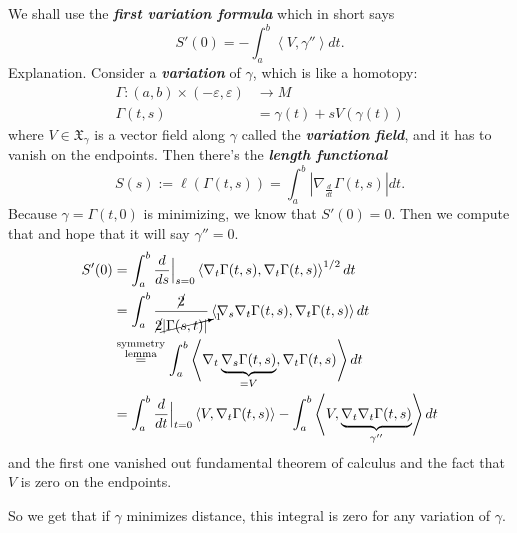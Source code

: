 We shall use the \textit{\textbf{first variation formula}} which in short says
\[S'(0)=-\int_a^b \left<V,\gamma''\right>dt.\]
Explanation. Consider a \textit{\textbf{variation}} of \(\gamma\), which is like a homotopy:
\begin{align*}
	\Gamma: (a,b)\times(-\varepsilon,\varepsilon) &\longrightarrow M \\
	\Gamma(t,s) &=\gamma(t)+sV(\gamma(t))
\end{align*}
where \(V \in \mathfrak{X}_\gamma\) is a vector field along \(\gamma\) called the \textit{\textbf{variation field}}, and it has to vanish on the endpoints. Then there's the \textit{\textbf{length functional}} 
\[S(s):=\ell(\Gamma(t,s))=\int_a^b|\nabla_{\frac{d}{dt}}\Gamma(t,s)|dt.\]
Because \(\gamma=\Gamma(t,0)\) is minimizing, we know that \(S'(0)=0\). Then we compute that and hope that it will say \(\gamma''=0\).
\begin{align*}
S'(0)&=\int_a^b\frac{d}{ds}\Big|_{s=0}\left<\nabla_t\Gamma(t,s),\nabla_t\Gamma(t,s)\right>^{1/2}dt\\
&=\int_a^b \frac{\cancel{2}}{\cancel{2}\cancelto{1}{\left|\Gamma(s,t)\right|}}\left<\nabla_s \nabla_t\Gamma(t,s),\nabla_t\Gamma(t,s)\right>dt\\
&\overset{\substack{\text{symmetry}  \\ \text{lemma} }}{=}\int_a^b\left<\nabla_t\underbrace{\nabla_s\Gamma(t,s)}_{=V},\nabla_t\Gamma(t,s)\right>dt\\
&=\int_a^b\frac{d}{dt}\Big|_{t=0}\left<V,\nabla_t\Gamma(t,s)\right>-\int_a^b\left<V,\underbrace{\nabla_t\nabla_t\Gamma(t,s)}_{\gamma''}\right>dt
\end{align*}
and the first one vanished out fundamental theorem of calculus and the fact that \(V\) is zero on the endpoints.

So we get that if \(\gamma\) minimizes distance, this integral is zero for any variation of \(\gamma\).

